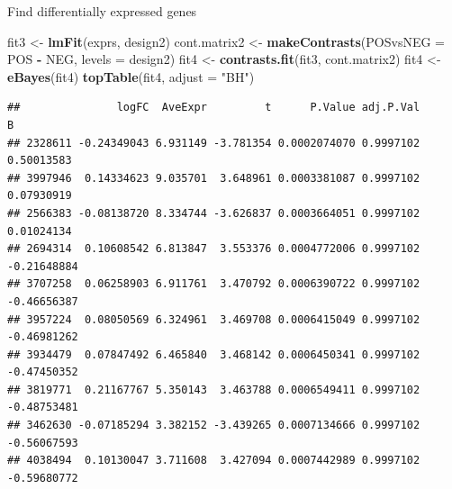 \documentclass[]{article}
\newenvironment{Shaded}{\begin{snugshade}}{\end{snugshade}}
\newcommand{\KeywordTok}[1]{\textcolor[rgb]{0.13,0.29,0.53}{\textbf{#1}}}
\newcommand{\DataTypeTok}[1]{\textcolor[rgb]{0.13,0.29,0.53}{#1}}
\newcommand{\FloatTok}[1]{\textcolor[rgb]{0.00,0.00,0.81}{#1}}
\newcommand{\StringTok}[1]{\textcolor[rgb]{0.31,0.60,0.02}{#1}}
\newcommand{\OtherTok}[1]{\textcolor[rgb]{0.56,0.35,0.01}{#1}}
\newcommand{\OperatorTok}[1]{\textcolor[rgb]{0.81,0.36,0.00}{\textbf{#1}}}
\newcommand{\NormalTok}[1]{#1}
\begin{document}
Find differentially expressed genes

\begin{Shaded}
\begin{Highlighting}[]
\NormalTok{fit3 <-}\StringTok{ }\KeywordTok{lmFit}\NormalTok{(exprs, design2)}
\NormalTok{cont.matrix2 <-}\StringTok{ }\KeywordTok{makeContrasts}\NormalTok{(}\DataTypeTok{POSvsNEG =}\NormalTok{ POS }\OperatorTok{-}\StringTok{ }\NormalTok{NEG, }\DataTypeTok{levels =}\NormalTok{ design2)}
\NormalTok{fit4 <-}\StringTok{ }\KeywordTok{contrasts.fit}\NormalTok{(fit3, cont.matrix2)}
\NormalTok{fit4 <-}\StringTok{ }\KeywordTok{eBayes}\NormalTok{(fit4)}
\KeywordTok{topTable}\NormalTok{(fit4, }\DataTypeTok{adjust =} \StringTok{"BH"}\NormalTok{)}
\end{Highlighting}
\end{Shaded}

\begin{verbatim}
##               logFC  AveExpr         t      P.Value adj.P.Val           B
## 2328611 -0.24349043 6.931149 -3.781354 0.0002074070 0.9997102  0.50013583
## 3997946  0.14334623 9.035701  3.648961 0.0003381087 0.9997102  0.07930919
## 2566383 -0.08138720 8.334744 -3.626837 0.0003664051 0.9997102  0.01024134
## 2694314  0.10608542 6.813847  3.553376 0.0004772006 0.9997102 -0.21648884
## 3707258  0.06258903 6.911761  3.470792 0.0006390722 0.9997102 -0.46656387
## 3957224  0.08050569 6.324961  3.469708 0.0006415049 0.9997102 -0.46981262
## 3934479  0.07847492 6.465840  3.468142 0.0006450341 0.9997102 -0.47450352
## 3819771  0.21167767 5.350143  3.463788 0.0006549411 0.9997102 -0.48753481
## 3462630 -0.07185294 3.382152 -3.439265 0.0007134666 0.9997102 -0.56067593
## 4038494  0.10130047 3.711608  3.427094 0.0007442989 0.9997102 -0.59680772
\end{verbatim}

\begin{Shaded}
\end{Shaded}
\end{document}
